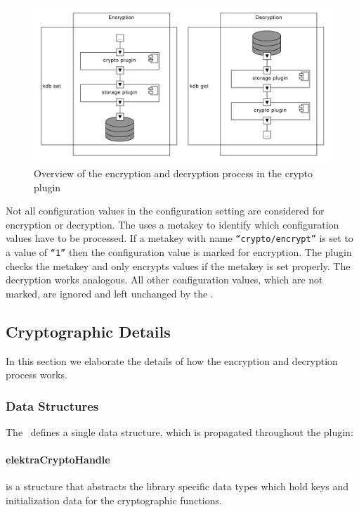 \begin{figure}[h]
\center
\caption{Overview of the encryption and decryption process in the crypto plugin}
\label{impl_crypto_overview}
\includegraphics[width=15.0cm]{umlet-figures/impl_crypto_overview.pdf}
\end{figure}

Not all configuration values in the configuration setting are considered for encryption or decryption.
The \crypto{} uses a metakey to identify which configuration values have to be processed.
If a metakey with name \texttt{``crypto/encrypt''} is set to a value of \texttt{``1''} then the configuration value is marked for encryption.
The plugin checks the metakey and only encrypts values if the metakey is set properly.
The decryption works analogous.
All other configuration values, which are not marked, are ignored and left unchanged by the \crypto.

\subsection{Cryptographic Details}

In this section we elaborate the details of how the encryption and decryption process works.

\subsubsection{Data Structures}

The \crypto ~defines a single data structure, which is propagated throughout the plugin:

\paragraph{elektraCryptoHandle} is a structure that abstracts the library specific data types which hold keys and initialization data for the cryptographic functions.


